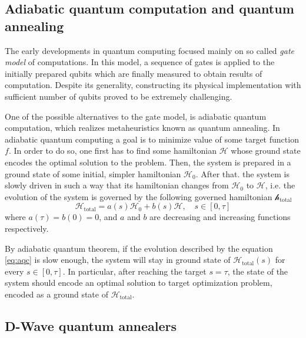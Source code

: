 \subsection{Adiabatic quantum computation and quantum annealing}
The early developments in quantum computing focused mainly on so called \emph{gate model} of computations. In this model, a sequence of gates is applied to the initially prepared qubits which are finally measured to obtain results of computation. Despite its generality, constructing its physical implementation with sufficient number of qubits proved to be extremely challenging.

One of the possible alternatives to the gate model, is adiabatic quantum computation, which realizes metaheuristics known as quantum annealing. In adiabatic quantum computing a goal is to minimize value of some target function $f$. In order to do so, one first has to find some hamiltonian $\mathcal{H}$ whose ground state encodes the optimal solution to the problem. Then, the system is prepared in a ground state of some initial, simpler hamiltonian $\mathcal{H}_0$. After that. the system is slowly driven in such a way that its hamiltonian changes from $\mathcal{H}_0$ to $\mathcal{H}$, i.e. the evolution of the system is governed by the following governed hamiltonian $\mathcal{h}_\text{total}$
\begin{equation}
    \label{eq:aqc}
    \mathcal{H}_\text{total} = a(s) \mathcal{H}_0 + b(s)\mathcal{H}, \quad s \in [0, \tau] 
\end{equation}
where $a(\tau) = b(0) = 0$, and $a$ and $b$ are decreasing and increasing functions respectively.

   By adiabatic quantum theorem, if the evolution described by the equation \eqref{eq:aqc} is slow enough, the system will stay in ground state of $\mathcal{H}_\text{total}(s)$ for every $s \in [0, \tau]$. In particular, after reaching the target $s=\tau$, the state of the system should encode an optimal solution to target optimization problem, encoded as a ground state of $\mathcal{H}_\text{total}$.


\subsection{D-Wave quantum annealers}

